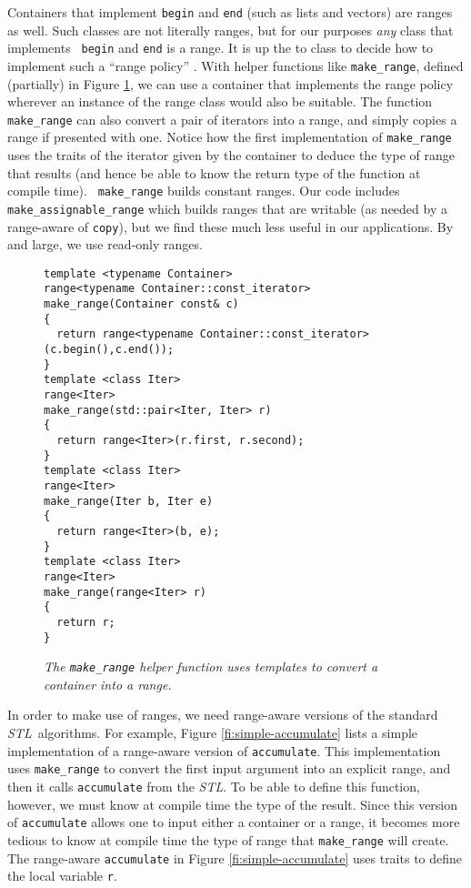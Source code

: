 \documentclass[12pt]{article}
\newcommand{\stl}{{\it STL}}
\begin{document}
  Containers that implement {\tt begin} and {\tt end} (such as lists
and vectors) are ranges as well.  Such classes are not literally
ranges, but for our purposes {\em any} class that implements {\tt
begin} and {\tt end} is a range.  It is up the to class to decide how
to implement such a ``range policy'' \citep[in the sense
of][]{alexandrescu01}.  With helper functions like {\tt make\_range},
defined (partially) in Figure \ref{fi:make-range}, we can use a
container that implements the range policy wherever an instance of the
range class would also be suitable.  The function {\tt make\_range}
can also convert a pair of iterators into a range, and simply copies a
range if presented with one.  Notice how the first implementation of
{\tt make\_range} uses the traits of the iterator given by the
container to deduce the type of range that results (and hence be able
to know the return type of the function at compile time).  {\tt
make\_range} builds constant ranges.  Our code includes {\tt
make\_assignable\_range} which builds ranges that are writable (as
needed by a range-aware of {\tt copy}), but we find these much less
useful in our applications.  By and large, we use read-only ranges.


\begin{figure}
\caption{ \label{fi:make-range}
\it The {\tt make\_range} helper function uses templates to convert a
container into a range.}
\begin{verbatim}
template <typename Container>
range<typename Container::const_iterator>
make_range(Container const& c)
{
  return range<typename Container::const_iterator>(c.begin(),c.end());
}
template <class Iter>
range<Iter>
make_range(std::pair<Iter, Iter> r)
{
  return range<Iter>(r.first, r.second);
}
template <class Iter>
range<Iter>
make_range(Iter b, Iter e)
{
  return range<Iter>(b, e);
}
template <class Iter>
range<Iter>
make_range(range<Iter> r)
{
  return r;
}
\end{verbatim}
\end{figure}


  In order to make use of ranges, we need range-aware versions of the
standard \stl\ algorithms.  For example, Figure
\ref{fi:simple-accumulate} lists a simple implementation of a
range-aware version of {\tt accumulate}.  This implementation uses
{\tt make\_range} to convert the first input argument into an explicit
range, and then it calls {\tt accumulate} from the \stl.  To be able
to define this function, however, we must know at compile time the
type of the result.  Since this version of {\tt accumulate} allows one
to input either a container or a range, it becomes more tedious to
know at compile time the type of range that {\tt make\_range} will
create.  The range-aware {\tt accumulate} in Figure
\ref{fi:simple-accumulate} uses traits to define the local variable
{\tt r}.
\end{document}
